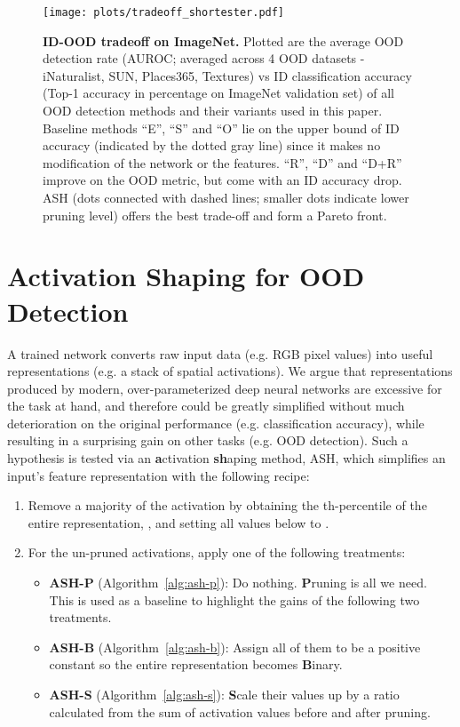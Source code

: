 \documentclass{article}
\newcommand{\figlabel}[1]{\label{fig:#1}}
\newcommand{\seclabel}[1]{\label{sec:#1}}
\newcommand{\algoref}[1]{Algorithm~\ref{alg:#1}}
\newcommand{\ac}{ASH\xspace}
\begin{document}
\begin{figure}[hbt!]
    \centering 
	\texttt{[image: plots/tradeoff\_shortester.pdf]}
	\caption{\textbf{ID-OOD tradeoff on ImageNet.} Plotted are the average OOD detection rate (AUROC; averaged across 4 OOD datasets - iNaturalist, SUN, Places365, Textures) vs ID classification accuracy (Top-1 accuracy in percentage on ImageNet validation set) of all OOD detection methods and their variants used in this paper. Baseline methods ``E'', ``S'' and ``O'' lie on the upper bound of ID accuracy (indicated by the dotted gray line) since it makes no modification of the network or the features. ``R'', ``D'' and ``D+R'' improve on the OOD metric, but come with an ID accuracy drop. ASH (dots connected with dashed lines; smaller dots indicate lower pruning level) offers the best trade-off and form a Pareto front.}
	\figlabel{tradeoff}
\end{figure}


\section{Activation Shaping for OOD Detection}
\seclabel{method}

A trained network converts raw input data (e.g. RGB pixel values) into useful representations (e.g. a stack of spatial activations). We argue that representations produced by modern, over-parameterized deep neural networks are excessive for the task at hand, and therefore could be greatly simplified without much deterioration on the original performance (e.g. classification accuracy), while resulting in a surprising gain on other tasks (e.g. OOD detection).
Such a hypothesis is tested via an \textbf{a}ctivation \textbf{sh}aping method, \ac, which simplifies an input's feature representation with the following recipe:

\begin{enumerate}
    \item Remove a majority of the activation by obtaining the th-percentile of the entire representation, , and setting all values below  to .
    \item For the un-pruned activations, apply one of the following treatments:
    \begin{itemize}
        \item \textbf{ASH-P} (\algoref{ash-p}): Do nothing. \textbf{P}runing is all we need. This is used as a baseline to highlight the gains of the following two treatments. 
        \item \textbf{ASH-B} (\algoref{ash-b}): Assign all of them to be a positive constant so the entire representation becomes \textbf{B}inary.
        \item \textbf{ASH-S} (\algoref{ash-s}): \textbf{S}cale their values up by a ratio calculated from the sum of activation values before and after pruning.
    \end{itemize}
\end{enumerate}
\end{document}
